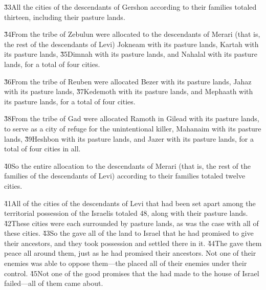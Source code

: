 \v{33}All the cities of the descendants of Gershon according to their families totaled thirteen, including their pasture lands.

\v{34}From the tribe of Zebulun were allocated to the descendants of Merari (that is, the rest of the descendants of Levi) Jokneam with its pasture lands, Kartah with its pasture lands, \v{35}Dimnah with its pasture lands, and Nahalal with its pasture lands, for a total of four cities.

\v{36}From the tribe of Reuben were allocated Bezer with its pasture lands, Jahaz with its pasture lands, \v{37}Kedemoth with its pasture lands, and Mephaath with its pasture lands, for a total of four cities.

\v{38}From the tribe of Gad were allocated Ramoth in Gilead with its pasture lands, to serve as a city of refuge for the unintentional killer, Mahanaim with its pasture lands, \v{39}Heshbon with its pasture lands, and Jazer with its pasture lands, for a total of four cities in all.

\v{40}So the entire allocation to the descendants of Merari (that is, the rest of the families of the descendants of Levi) according to their families totaled twelve cities.

\v{41}All of the cities of the descendants of Levi that had been set apart among the territorial possession of the Israelis totaled 48, along with their pasture lands. \v{42}These cities were each surrounded by pasture lands, as was the case with all of these cities. \v{43}So the  gave all of the land to Israel that he had promised to give their ancestors, and they took possession and settled there in it. \v{44}The  gave them peace all around them, just as he had promised their ancestors. Not one of their enemies was able to oppose them---the  placed all of their enemies under their control. \v{45}Not one of the good promises that the  had made to the house of Israel failed---all of them came about.


